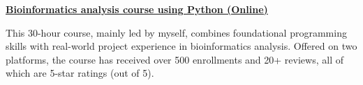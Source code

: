 \textbf{\href{https://www.bioinfo.info/p/t_pc/goods_pc_detail/goods_detail/course_2SvfNlIVzrKfOcexHk9Nute5Bhd}{Bioinformatics analysis course using Python (Online)}}

This 30-hour course, mainly led by myself, combines foundational programming skills with real-world project experience in bioinformatics analysis. 
Offered on two platforms, the course has received over 500 enrollments and 20+ reviews, 
all of which are 5-star ratings (out of 5).